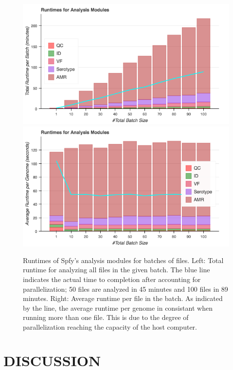 \documentclass{article}
\begin{document}
\begin{figure}[!htb]
  \includegraphics[width=\linewidth]{images/spfy_batches_totals.png}
\endminipage\hfill
{}%
  \includegraphics[width=\linewidth]{images/spfy_batches.png}
\endminipage
\caption{Runtimes of Spfy's analysis modules for batches of files. Left: Total runtime for analyzing all files in the given batch. The blue line indicates the actual time to completion after accounting for parallelization; 50 files are analyzed in 45 minutes and 100 files in 89 minutes. Right: Average runtime per file in the batch. As indicated by the line, the average runtime per genome in consistant when running more than one file. This is due to the degree of parallelization reaching the capacity of the host computer.}\label{fig:spfy_performance_batches}
\end{figure}

\section{DISCUSSION}
\end{document}
